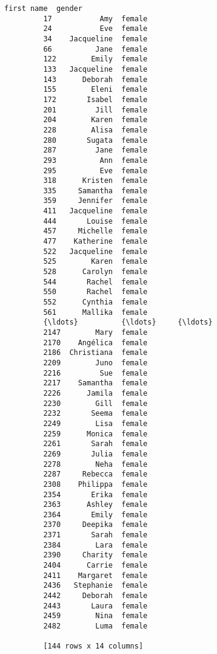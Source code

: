 \documentclass[11pt]{article}
\begin{document}
\begin{Verbatim}[commandchars=\\\{\}]
               first name  gender  
         17           Amy  female  
         24           Eve  female  
         34    Jacqueline  female  
         66          Jane  female  
         122        Emily  female  
         133   Jacqueline  female  
         143      Deborah  female  
         155        Eleni  female  
         172       Isabel  female  
         201         Jill  female  
         204        Karen  female  
         228        Alisa  female  
         280       Sugata  female  
         287         Jane  female  
         293          Ann  female  
         295          Eve  female  
         318      Kristen  female  
         335     Samantha  female  
         359     Jennifer  female  
         411   Jacqueline  female  
         444       Louise  female  
         457     Michelle  female  
         477    Katherine  female  
         522   Jacqueline  female  
         525        Karen  female  
         528      Carolyn  female  
         544       Rachel  female  
         550       Rachel  female  
         552      Cynthia  female  
         561      Mallika  female  
         {\ldots}          {\ldots}     {\ldots}  
         2147        Mary  female  
         2170    Angélica  female  
         2186  Christiana  female  
         2209        Juno  female  
         2216         Sue  female  
         2217    Samantha  female  
         2226      Jamila  female  
         2230        Gill  female  
         2232       Seema  female  
         2249        Lisa  female  
         2259      Monica  female  
         2261       Sarah  female  
         2269       Julia  female  
         2278        Neha  female  
         2287     Rebecca  female  
         2308    Philippa  female  
         2354       Erika  female  
         2363      Ashley  female  
         2364       Emily  female  
         2370     Deepika  female  
         2371       Sarah  female  
         2384        Lara  female  
         2390     Charity  female  
         2404      Carrie  female  
         2411    Margaret  female  
         2436   Stephanie  female  
         2442     Deborah  female  
         2443       Laura  female  
         2459        Nina  female  
         2482        Luma  female  
         
         [144 rows x 14 columns]
\end{Verbatim}
            
\end{document}
